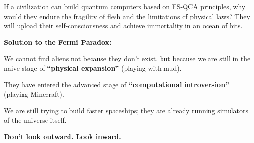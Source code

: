 If a civilization can build quantum computers based on FS-QCA principles, why would they endure the fragility of flesh and the limitations of physical laws? They will upload their self-consciousness and achieve immortality in an ocean of bits.

\textbf{Solution to the Fermi Paradox:}

We cannot find aliens not because they don't exist, but because we are still in the naive stage of \textbf{``physical expansion''} (playing with mud).

They have entered the advanced stage of \textbf{``computational introversion''} (playing Minecraft).

We are still trying to build faster spaceships; they are already running simulators of the universe itself.

\textbf{Don't look outward. Look inward.}

